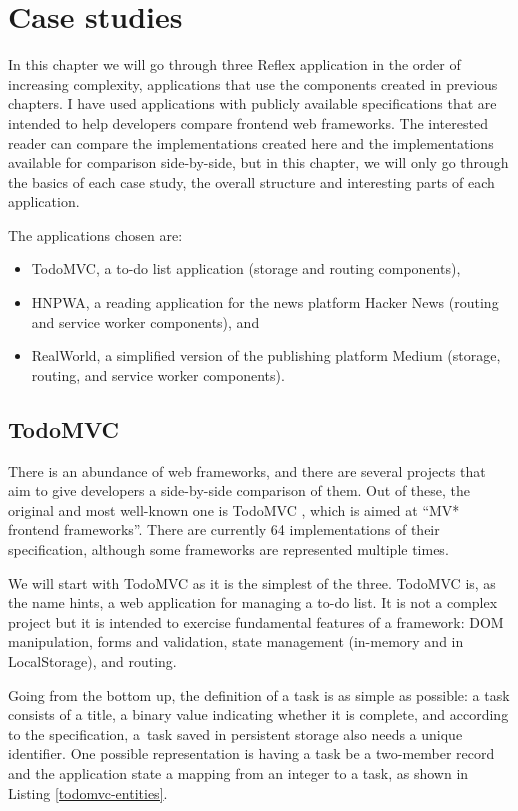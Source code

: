\documentclass[english,odsaz]{fitthesis}
\begin{document}
\chapter{Case studies}
\label{sec:orgcb3aecb}
In this chapter we will go through three Reflex application in the order of
increasing complexity, applications that use the components created in previous
chapters. I have used applications with publicly available specifications that
are intended to help developers compare frontend web frameworks. The interested
reader can compare the implementations created here and the implementations
available for comparison side-by-side, but in this chapter, we will only go
through the basics of each case study, the overall structure and interesting
parts of each application.

The applications chosen are:
\begin{itemize}
\item TodoMVC, a to-do list application (storage and routing components),
\item HNPWA, a reading application for the news platform Hacker News (routing and
service worker components), and
\item RealWorld, a simplified version of the publishing platform Medium (storage,
routing, and service worker components).
\end{itemize}

\section{TodoMVC}
\label{sec:org1efeb26}
There is an abundance of web frameworks, and there are several projects that aim
to give developers a side-by-side comparison of them. Out of these, the original
and most well-known one is TodoMVC \cite{todomvc}, which is aimed at ``MV* frontend
frameworks''. There are currently 64 implementations of their specification, although
some frameworks are represented multiple times.

We will start with TodoMVC as it is the simplest of the three. TodoMVC is, as
the name hints, a web application for managing a to-do list. It is not a complex
project but it is intended to exercise fundamental features of a framework: DOM
manipulation, forms and validation, state management (in-memory and in
LocalStorage), and routing.

Going from the bottom up, the definition of a task is as simple as possible: a
task consists of a title, a binary value indicating whether it is complete, and
according to the specification, a~task saved in persistent storage also
needs a unique identifier. One possible representation is having a task be a
two-member record and the application state a mapping from an integer to a task,
as shown in Listing \ref{todomvc-entities}.
\end{document}
